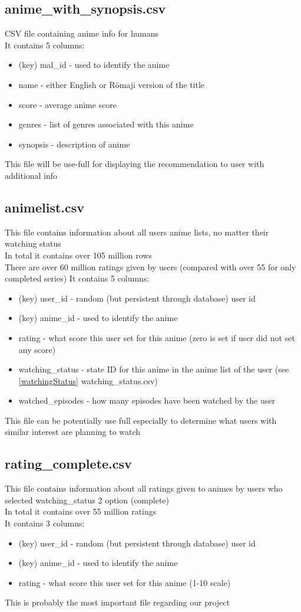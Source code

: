 \subsection{anime\_with\_synopsis.csv}
CSV file containing anime info for humans \\ 
It contains 5 columns:
\begin{itemize}
    \item (key) mal\_id - used to identify the anime
    \item name - either English or R\=omaji version of the title 
    \item score - average anime score
    \item genres - list of genres associated with this anime
    \item synopsis - description of anime
\end{itemize}
This file will be use-full for displaying the recommendation to user with additional info
\subsection{animelist.csv}
This file contains information about all users anime lists, no matter their watching status \\ 
In total it contains over 105 million rows \\ 
There are over 60 million ratings given by users (compared with over 55 for only completed series)
It contains 5 columns:
\begin{itemize}
    \item (key) user\_id - random (but persistent through database) user id 
    \item (key) anime\_id - used to identify the anime 
    \item rating - what score this user set for this anime (zero is set if user did not set any score)
    \item watching\_status - state ID for this anime in the anime list of the user (see \ref{watchingStatus} watching\_status.csv)
    \item watched\_episodes - how many episodes have been watched by the user
\end{itemize}
This file can be potentially use full especially to determine what users with similar interest are planning to watch 
\subsection{rating\_complete.csv}
This file contains information about all ratings given to animes by users who selected watching\_status 2 option (complete) \\ 
In total it contains over 55 million ratings \\ 
It contains 3 columns:
\begin{itemize}
    \item (key) user\_id - random (but persistent through database) user id 
    \item (key) anime\_id - used to identify the anime 
    \item rating - what score this user set for this anime (1-10 scale)
\end{itemize}
This is probably the most important file regarding our project
